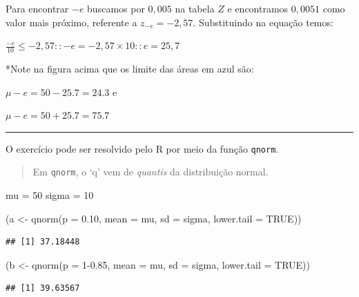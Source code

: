 \documentclass[
]{book}
\newenvironment{Shaded}{\begin{snugshade}}{\end{snugshade}}
\newcommand{\AttributeTok}[1]{\textcolor[rgb]{0.77,0.63,0.00}{#1}}
\newcommand{\ConstantTok}[1]{\textcolor[rgb]{0.00,0.00,0.00}{#1}}
\newcommand{\DecValTok}[1]{\textcolor[rgb]{0.00,0.00,0.81}{#1}}
\newcommand{\FloatTok}[1]{\textcolor[rgb]{0.00,0.00,0.81}{#1}}
\newcommand{\FunctionTok}[1]{\textcolor[rgb]{0.00,0.00,0.00}{#1}}
\newcommand{\NormalTok}[1]{#1}
\newcommand{\OtherTok}[1]{\textcolor[rgb]{0.56,0.35,0.01}{#1}}
\begin{document}
Para encontrar \(-e\) buscamos por \(0,005\) na tabela \(Z\) e encontramos \(0,0051\) como valor mais próximo, referente a \(z_{-e} = -2,57\). Substituindo na equação temos:

\(\frac{-e}{10} \le -2,57 :: -e = -2,57 \times 10 :: e = 25,7\)

*Note na figura acima que os limite das áreas em azul são:

\(\mu - e = 50 - 25.7 = 24.3\) e

\(\mu - e = 50 + 25.7 = 75.7\)

\begin{center}\rule{0.5\linewidth}{0.5pt}\end{center}

O exercício pode ser resolvido pelo R por meio da função \texttt{qnorm}.

\begin{quote}
Em \texttt{qnorm}, o `q' vem de \emph{quantis} da distribuição normal.
\end{quote}

\begin{Shaded}
\begin{Highlighting}[]
\NormalTok{mu }\OtherTok{=} \DecValTok{50}
\NormalTok{sigma }\OtherTok{=} \DecValTok{10}

\NormalTok{(a }\OtherTok{\textless{}{-}} \FunctionTok{qnorm}\NormalTok{(}\AttributeTok{p =} \FloatTok{0.10}\NormalTok{, }\AttributeTok{mean =}\NormalTok{ mu, }\AttributeTok{sd =}\NormalTok{ sigma, }\AttributeTok{lower.tail =} \ConstantTok{TRUE}\NormalTok{))}
\end{Highlighting}
\end{Shaded}

\begin{verbatim}
## [1] 37.18448
\end{verbatim}

\begin{Shaded}
\begin{Highlighting}[]
\NormalTok{(b }\OtherTok{\textless{}{-}} \FunctionTok{qnorm}\NormalTok{(}\AttributeTok{p =} \DecValTok{1}\FloatTok{{-}0.85}\NormalTok{, }\AttributeTok{mean =}\NormalTok{ mu, }\AttributeTok{sd =}\NormalTok{ sigma, }\AttributeTok{lower.tail =} \ConstantTok{TRUE}\NormalTok{))}
\end{Highlighting}
\end{Shaded}

\begin{verbatim}
## [1] 39.63567
\end{verbatim}
\end{document}
